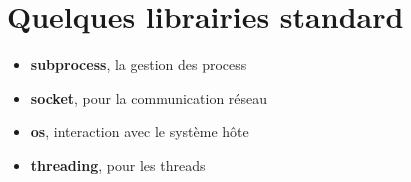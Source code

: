 \section{Quelques librairies standard}
\begin{frame}[fragile]
  \begin{itemize}
    \item<1-> {\bf subprocess}, la gestion des process
    \item<2-> {\bf socket}, pour la communication réseau
    \item<3-> {\bf os}, interaction avec le système hôte
    \item<4-> {\bf threading}, pour les threads
  \end{itemize}
\end{frame}
